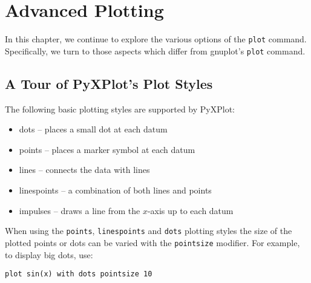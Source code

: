 %
%
%
%
%



\chapter{Advanced Plotting}

In this chapter, we continue to explore the various options of the {\tt plot}
command. Specifically, we turn to those aspects which differ from gnuplot's
{\tt plot} command.


\section{A Tour of PyXPlot's Plot Styles}

The following basic plotting styles are supported by PyXPlot:
\begin{itemize}
\item dots -- places a small dot at each datum
\item points -- places a marker symbol at each datum
\item lines -- connects the data with lines
\item linespoints -- a combination of both lines and points
\item impulses -- draws a line from the $x$-axis up to each datum
\end{itemize}

When using the \texttt{points}, \texttt{linespoints} and \texttt{dots} plotting
styles the size of the plotted points or dots can be varied with the
\texttt{pointsize} modifier. For example, to display big dots, use:

\begin{verbatim}
plot sin(x) with dots pointsize 10
\end{verbatim}


